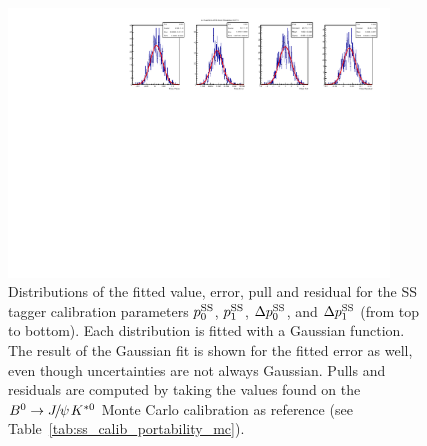 \begin{figure}[t]
\begin{center}
    \includegraphics[width=0.9\textwidth]{AA-Appdx-mcbootstrap/figs/1DPullPlot_dp_1_RLogisticCalibration_MCTruth_Bd2JpsiKst_FullReweightAligned_SS_20171116_SSbarAccAsymmFTFloatDMGammaConstrAllSamples.pdf}
  \end{center}
  \vspace{-2mm}
  \caption{Distributions of the fitted value, error, pull and residual for the SS tagger calibration parameters $p_0^{\rm SS}$, $p_1^{\rm SS}$, $\Delta p_0^{\rm SS}$, and $\Delta p_1^{\rm SS}$ (from top to bottom). Each distribution is fitted with a Gaussian function. The result of the Gaussian fit is shown for the fitted error as well, even though uncertainties are not always Gaussian. Pulls and residuals are computed by taking the values found on the $\Bz\to\jpsi\Kstarz$ Monte Carlo calibration as reference (see Table~\ref{tab:ss_calib_portability_mc}).}
  \label{fig:mc_bootstrap_ss}
\end{figure}

